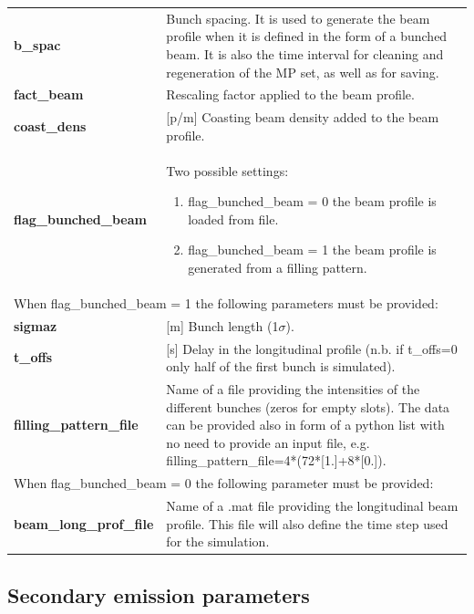 \documentclass[a4paper,12pt]{article}
\begin{document}
\begin{longtable}{p{}p{}}
\hline\endfirsthead\hline\endhead\rowcolor{Gray}
\multicolumn{2}{p{.97\textwidth}}{
\textbf{Beam longitudinal profile}}\\ \hline
\textbf{b\_spac}&	Bunch spacing. It is used to generate the beam profile when it is defined in the form of a bunched beam. It is also the time interval for cleaning and regeneration of the MP set, as well as for saving.\\ \hline
\textbf{fact\_beam}&	Rescaling factor applied to the beam profile.\\ \hline
\textbf{coast\_dens}&	[p/m] Coasting beam density added to the beam profile. \\ \hline
\textbf{flag\_bunched\_beam}&	Two possible settings:
\begin{enumerate}
\item flag\_bunched\_beam = 0 the beam profile is loaded from file.
\item flag\_bunched\_beam = 1 the beam profile is generated from a filling pattern.
\end{enumerate}\\ \hline
\multicolumn{2}{p{.97\textwidth}}{
When flag\_bunched\_beam = 1 the following parameters must be provided:}\\ \hline
\textbf{sigmaz}&	[m] Bunch length (1$\sigma$). \\ \hline
\textbf{t\_offs}&	[s] Delay in the longitudinal profile (n.b. if t\_offs=0 only half of the first bunch is simulated).\\ \hline
\textbf{filling\_pattern\_file}&	Name of a file providing the intensities of the different bunches (zeros for empty slots).
The data can be provided also in form of a python list with no need to provide an input file, e.g. filling\_pattern\_file=4*(72*[1.]+8*[0.]).\\ \hline
\multicolumn{2}{p{.97\textwidth}}{
When flag\_bunched\_beam = 0 the following parameter must be provided:}\\ \hline
\textbf{beam\_long\_prof\_file}&	Name of a .mat file providing the longitudinal beam profile. This file will also define the time step used for the simulation.\\
\hline
\end{longtable}


\newpage\subsection{Secondary emission parameters}
\end{document}
